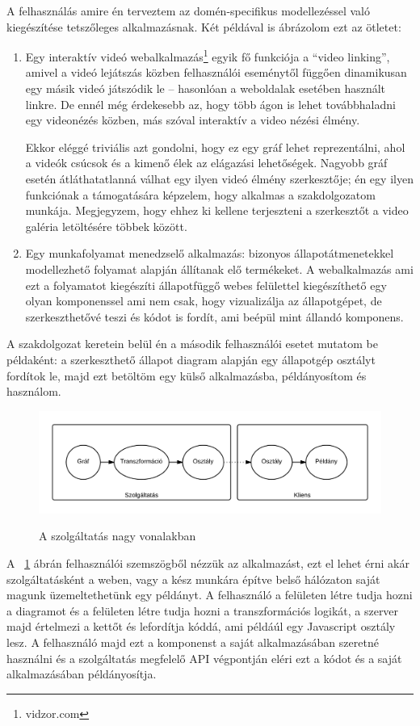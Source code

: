 A felhasználás amire én terveztem az domén-specifikus modellezéssel való kiegészítése tetszőleges alkalmazásnak. Két példával is ábrázolom ezt az ötletet:
\begin{enumerate}
\item Egy interaktív videó webalkalmazás\footnote{vidzor.com} egyik fő funkciója a ``video linking'', amivel a videó lejátszás közben felhasználói eseménytől függően dinamikusan egy másik videó játszódik le -- hasonlóan a weboldalak esetében használt linkre. De ennél még érdekesebb az, hogy több ágon is lehet továbbhaladni egy videonézés közben, más szóval interaktív a video nézési élmény. 

Ekkor eléggé triviális azt gondolni, hogy ez egy gráf lehet reprezentálni, ahol a videók csúcsok és a kimenő élek az elágazási lehetőségek. Nagyobb gráf esetén átláthatatlanná válhat egy ilyen videó élmény szerkesztője; én egy ilyen funkciónak a támogatására képzelem, hogy alkalmas a szakdolgozatom munkája. Megjegyzem, hogy ehhez ki kellene terjeszteni a szerkesztőt a video galéria letöltésére többek között. 
\item Egy munkafolyamat menedzselő alkalmazás: bizonyos állapotátmenetekkel modellezhető folyamat alapján állítanak elő termékeket. A webalkalmazás ami ezt a folyamatot kiegészíti állapotfüggő webes felülettel kiegészíthető egy olyan komponenssel ami nem csak, hogy vizualizálja az állapotgépet, de szerkeszthetővé teszi és kódot is fordít, ami beépül mint állandó komponens. 

\end{enumerate}

A szakdolgozat keretein belül én a második felhasználói esetet mutatom be példaként: a szerkeszthető állapot diagram alapján egy állapotgép osztályt fordítok le, majd ezt betöltöm egy külső alkalmazásba, példányosítom és használom.

\begin{figure}[!ht]
\centering
\includegraphics[width=\textwidth,height=\textheight,keepaspectratio]{figures/flow.png}\\
\caption{A szolgáltatás nagy vonalakban}
\label{fig:flow}
\end{figure}

A ~\ref{fig:flow} ábrán felhasználói szemszögből nézzük az alkalmazást, ezt el lehet érni akár szolgáltatásként a weben, vagy a kész munkára építve belső hálózaton saját magunk üzemeltethetünk egy példányt. A felhasználó a felületen létre tudja hozni a diagramot és a felületen létre tudja hozni a transzformációs logikát, a szerver majd értelmezi a kettőt és lefordítja kóddá, ami példáúl egy Javascript osztály lesz. A felhasználó majd ezt a komponenst a saját alkalmazásában szeretné használni és a szolgáltatás megfelelő API végpontján eléri ezt a kódot és a saját alkalmazásában példányosítja.



